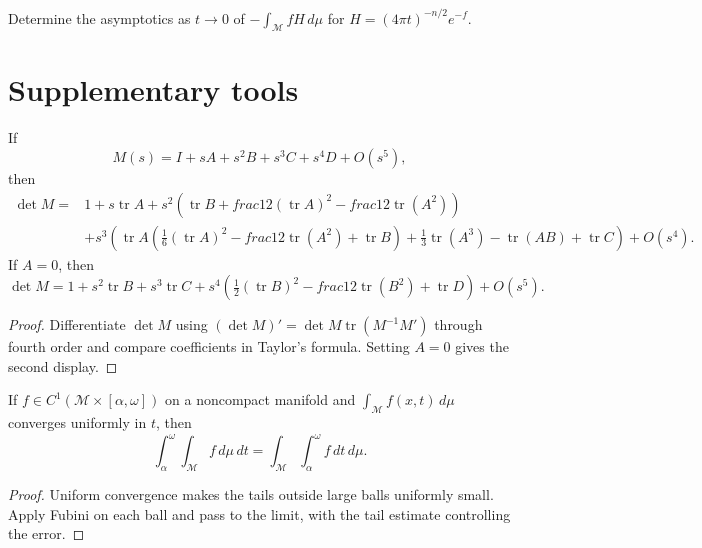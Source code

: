 \begin{example}
\label{ex:chow-iii-ch23-entropy-problem}
Determine the asymptotics as $t\to0$ of $-\int_{\mathcal M}fH\,d\mu$ for
$H=(4\pi t)^{-n/2}e^{-f}$.
\end{example}

\section{Supplementary tools}

\begin{lemma}
\label{lem:chow-iii-ch23-determinant-expansion}
If
\[
M(s)=I+sA+s^2B+s^3C+s^4D+O(s^5),
\]
then
\[
\begin{aligned}
\det M={}&1+s\operatorname{tr}A+s^2\left(\operatorname{tr}B+	frac12(\operatorname{tr}A)^2-	frac12\operatorname{tr}(A^2)\right)\\
&+s^3\left(\operatorname{tr}A(\tfrac16(\operatorname{tr}A)^2-	frac12\operatorname{tr}(A^2)+\operatorname{tr}B)+\tfrac13\operatorname{tr}(A^3)-\operatorname{tr}(AB)+\operatorname{tr}C\right)+O(s^4).
\end{aligned}
\]
If $A=0$, then
\[
\det M=1+s^2\operatorname{tr}B+s^3\operatorname{tr}C+s^4\left(\tfrac12(\operatorname{tr}B)^2-	frac12\operatorname{tr}(B^2)+\operatorname{tr}D\right)+O(s^5).
\]
\end{lemma}
\begin{proof}
Differentiate $\det M$ using
\( (\det M)'=\det M\operatorname{tr}(M^{-1}M')\) through fourth order and
compare coefficients in Taylor's formula.  Setting $A=0$ gives the second
display.
\end{proof}

\begin{lemma}
\label{lem:chow-iii-ch23-fubini-noncompact}
If $f\in C^1(\mathcal M\times[\alpha,\omega])$ on a noncompact manifold and
\(\int_{\mathcal M}f(x,t)\,d\mu\) converges uniformly in $t$, then
\[
\int_\alpha^\omega\int_{\mathcal M}f\,d\mu\,dt
=\int_{\mathcal M}\int_\alpha^\omega f\,dt\,d\mu.
\]
\end{lemma}
\begin{proof}
Uniform convergence makes the tails outside large balls uniformly small.  Apply
Fubini on each ball and pass to the limit, with the tail estimate controlling
the error.
\end{proof}

